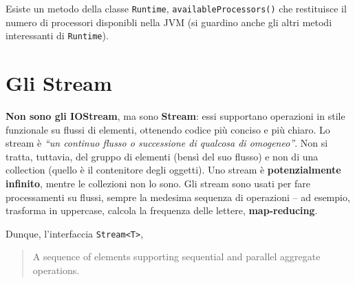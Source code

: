 \documentclass[\fontsizeclass,twocolumn]{\classname}
\theoremstyle{definition}
\theoremstyle{definition}
\begin{document}
Esiste un metodo della classe \texttt{Runtime}, \texttt{availableProcessors()}
che restituisce il numero di processori disponibli nella JVM (si guardino anche
gli altri metodi interessanti di \texttt{Runtime}).

\chapter{Gli Stream}

\textbf{Non sono gli IOStream}, ma sono \textbf{Stream}: essi supportano
operazioni in stile funzionale su flussi di elementi, ottenendo codice più
conciso e più chiaro. Lo stream è \emph{``un continuo flusso o successione di
qualcosa di omogeneo''}. Non si tratta, tuttavia, del gruppo di elementi (bensì
del suo flusso) e non di una collection (quello è il contenitore degli
oggetti). Uno stream è \textbf{potenzialmente infinito}, mentre le collezioni
non lo sono. Gli stream sono usati per fare processamenti su flussi, sempre la
medesima sequenza di operazioni -- ad esempio, trasforma in uppercase, calcola
la frequenza delle lettere, \textbf{map\--reducing}.

Dunque, l'interfaccia \texttt{Stream<T>},
\begin{quote}
    \footnotesize{A sequence of elements supporting sequential and parallel aggregate operations.

}
\end{quote}
\end{document}
